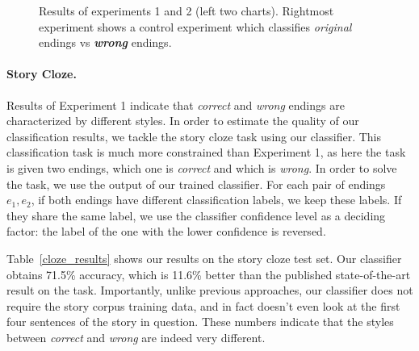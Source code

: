 \documentclass[11pt,a4paper]{article}
\newcommand{\tabref}[1]{Table~\ref{#1}}
\begin{document}
\begin{figure}
\caption{\label{results} Results of  experiments 1 and 2 (left two charts). 
Rightmost experiment shows a control experiment which classifies {\it original} endings vs \textit{\textbf{wrong}} endings. }
\end{figure}


\paragraph{Story Cloze.}
Results of Experiment 1 indicate that {\it correct} and {\it wrong} endings are characterized by different styles.
In order to estimate the quality of our classification results, we tackle the story cloze task using our classifier.
This classification task is much more constrained than Experiment 1, as here the task is given two endings, which one is {\it correct} and which is {\it wrong}.
In order to solve the task, we use the output of our trained classifier. 
For each pair of endings $e_1,e_2$, if both endings have different classification labels, we keep these labels. 
If they share the same label, we use the classifier confidence level as a deciding factor: the label of the one with the lower confidence is reversed. 

\tabref{cloze_results} shows our results on the story cloze test set. Our classifier obtains 71.5\% accuracy, which is 11.6\% better than the published state-of-the-art result on the task.
Importantly, unlike previous approaches, our classifier does not require the story corpus training data, and in fact doesn't even look at the first four sentences of the story in question.
These numbers indicate that the styles between {\it correct} and {\it wrong} are indeed very different.
\end{document}

